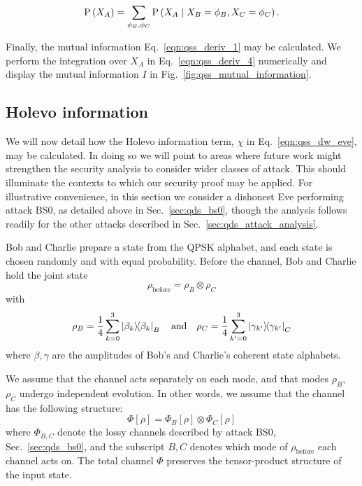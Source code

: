 \begin{equation}\label{eqn:qss_deriv_pxa}
\text{P}\left(X_A\right) = \sum_{\phi_B, \phi_C} \text{P}\left(X_A \; \middle| \; X_B=\phi_B, X_C=\phi_C\right).
\end{equation}


\noindent Finally, the mutual information Eq.~\ref{eqn:qss_deriv_1} may be calculated. We perform the integration over $X_A$ in Eq.~\ref{eqn:qss_deriv_4} numerically and display the mutual information $I$ in Fig.~\ref{fig:qss_mutual_information}.


\subsection{Holevo information}

We will now detail how the Holevo information term, $\chi$ in Eq.~\ref{eqn:qss_dw_eve}, may be calculated. In doing so we will point to areas where future work might strengthen the security analysis to consider wider classes of attack. This should illuminate the contexts to which our security proof may be applied. For illustrative convenience, in this section we consider a dishonest Eve performing attack BS$0$, as detailed above in Sec.~\ref{sec:qds_bs0}, though the analysis follows readily for the other attacks described in Sec.~\ref{sec:qds_attack_analysis}. %

Bob and Charlie prepare a state from the QPSK alphabet, and each state is chosen randomly and with equal probability. Before the channel, Bob and Charlie hold the joint state
\begin{equation}
\rho_{\text{before}} = \rho_B \otimes \rho_C
\end{equation}
with
\begin{equation}\label{eqn:qss_initial_states}
\rho_B = \frac{1}{4} \sum_{k=0}^3 \dyad{\beta_k}_B \qq{and} \rho_C = \frac{1}{4} \sum_{k^\prime = 0}^3 \dyad{\gamma_{k^\prime}}_C
\end{equation}
where $\beta, \gamma$ are the amplitudes of Bob's and Charlie's coherent state alphabets.

We assume that the channel acts separately on each mode, and that modes $\rho_B$, $\rho_C$ undergo independent evolution. In other words, we assume that the channel has the following structure:
\begin{equation}\label{eqn:qss_channel}
\Phi\left[\rho\right] = \Phi_B\left[\rho\right] \otimes \Phi_C\left[\rho\right]
\end{equation}
where $\Phi_{B, C}$ denote the lossy channels described by attack BS$0$, Sec.~\ref{sec:qds_bs0}, and the subscript $B, C$ denotes which mode of $\rho_{\text{before}}$ each channel acts on. The total channel $\Phi$ preserves the tensor-product structure of the input state.


